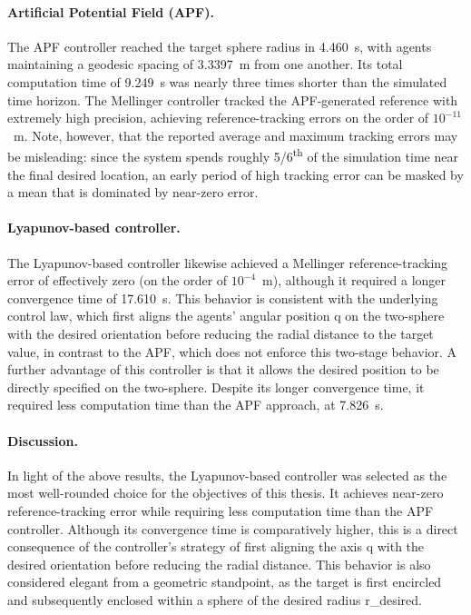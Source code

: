 \paragraph{Artificial Potential Field (APF).} The \gls{APF} controller reached the target sphere radius in \SI{4.460}{\second}, with agents maintaining a geodesic spacing of \SI{3.3397}{\meter} from one another. Its total computation time of \SI{9.249}{\second} was nearly three times shorter than the simulated time horizon. The Mellinger controller tracked the \gls{APF}-generated reference with extremely high precision, achieving reference-tracking errors on the order of $10^{-11}$~\si{\meter}. Note, however, that the reported average and maximum tracking errors may be misleading: since the system spends roughly 5/6\textsuperscript{th} of the simulation time near the final desired location, an early period of high tracking error can be masked by a mean that is dominated by near-zero error.

\paragraph{Lyapunov-based controller.} The Lyapunov-based controller likewise achieved a Mellinger reference-tracking error of effectively zero (on the order of $10^{-4}$~\si{\meter}), although it required a longer convergence time of \SI{17.610}{\second}. This behavior is consistent with the underlying control law, which first aligns the agents' angular position \gls{q} on the two-sphere with the desired orientation before reducing the radial distance to the target value, in contrast to the \gls{APF}, which does not enforce this two-stage behavior. A further advantage of this controller is that it allows the desired position to be directly specified on the two-sphere. Despite its longer convergence time, it required less computation time than the \gls{APF} approach, at \SI{7.826}{\second}.

\paragraph{Discussion.} In light of the above results, the Lyapunov-based controller was selected as the most well-rounded choice for the objectives of this thesis. It achieves near-zero reference-tracking error while requiring less computation time than the \gls{APF} controller. Although its convergence time is comparatively higher, this is a direct consequence of the controller's strategy of first aligning the axis \gls{q} with the desired orientation before reducing the radial distance. This behavior is also considered elegant from a geometric standpoint, as the target is first encircled and subsequently enclosed within a sphere of the desired radius \gls{r_desired}.

